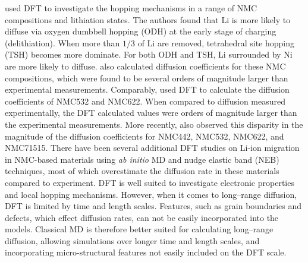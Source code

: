 \documentclass[journal=jacsat,manuscript=article]{achemso}
\begin{document}
\citeauthor{wei2015kinetics} used DFT to investigate the hopping mechanisms in a range of NMC compositions and lithiation states.\cite{wei2015kinetics}
The authors found that Li is more likely to diffuse via oxygen dumbbell hopping (ODH) at the early stage of charging (delithiation).
When more than $1/3$ of Li are removed, tetrahedral site hopping (TSH) becomes more dominate.
For both ODH and TSH, Li surrounded by Ni are more likely to diffuse.
\citeauthor{wei2015kinetics} also calculated diffusion coefficients for these NMC compositions, which were found to be several orders of magnitude larger than experimental measurements.\cite{wei2015kinetics}
Comparably, \citeauthor{cui2016optimized} used DFT to calculate the diffusion coefficients of NMC532 and NMC622.
When compared to diffusion measured experimentally, the DFT calculated values were orders of magnitude larger than the experimental measurements.\cite{cui2016optimized}
More recently, \citeauthor{zhu2021effect} also observed this disparity in the magnitude of the diffusion coefficients for NMC442, NMC532, NMC622, and NMC71515.\cite{zhu2021effect}
There have been several additional DFT studies on Li-ion migration in NMC-based materials using \textit{ab initio} MD and nudge elastic band (NEB) techniques, most of which overestimate the diffusion rate in these materials compared to experiment.\cite{dixit2016thermodynamic,huang2016investigation,li2020direct,van_der_ven_layered_2001,xiao2012density}
DFT is well suited to investigate electronic properties and local hopping mechanisms.\cite{van_der_ven_layered_2001}
However, when it comes to long--range diffusion, DFT is limited by time and length scales.
Features, such as grain boundaries and defects,\cite{abakumov2021grain} which effect diffusion rates, can not be easily incorporated into the models.
Classical MD is therefore better suited for calculating long--range diffusion, allowing simulations over longer time and length scales, and incorporating micro-structural features not easily included on the DFT scale.
\end{document}
